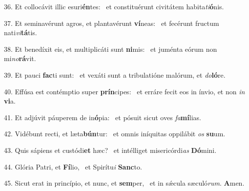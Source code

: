 36. Et collocávit illic esuri\textbf{én}tes: \ast\  et constituérunt civitátem habita\textit{ti}\textbf{ó}nis.\

37. Et seminavérunt agros, et plantavérunt \textbf{ví}neas: \ast\  et fecérunt fructum nati\textit{vi}\textbf{tá}tis.\

38. Et benedíxit eis, et multiplicáti sunt \textbf{ni}mis: \ast\  et juménta eórum non mi\textit{no}\textbf{rá}vit.\

39. Et pauci \textbf{fac}ti sunt: \ast\  et vexáti sunt a tribulatióne malórum, et \textit{do}\textbf{ló}re.\

40. Effúsa est contémptio super \textbf{prín}cipes: \ast\  et erráre fecit eos in ínvio, et non \textit{in} \textbf{vi}a.\

41. Et adjúvit páuperem de in\textbf{ó}pia: \ast\  et pósuit sicut oves \textit{fa}\textbf{mí}lias.\

42. Vidébunt recti, et læta\textbf{bún}tur: \ast\  et omnis iníquitas oppilábit \textit{os} \textbf{su}um.\

43. Quis sápiens et custódi\textbf{et} hæc? \ast\  et intélliget misericórdi\textit{as} \textbf{Dó}mini.\

44. Glória Patri, et \textbf{Fí}lio, \ast\  et Spirítu\textit{i} \textbf{Sanc}to.\

45. Sicut erat in princípio, et nunc, et \textbf{sem}per, \ast\  et in sǽcula sæculó\textit{rum}. \textbf{A}men.\

